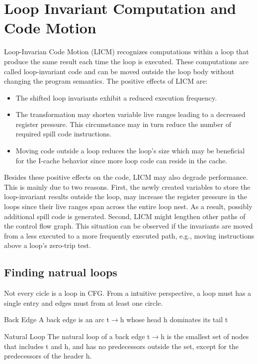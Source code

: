 \newpage

\section{Loop Invariant Computation and Code Motion}


Loop-Invarian Code Motion (LICM) recognizes computations within a loop that produce the same result each time the loop is executed. 
These computations are called loop-invariant code and can be moved outside the loop body without changing the program semantics. 
The positive effects of LICM are:
\begin{itemize}
\item The shifted loop invariants exhibit a reduced execution frequency.
\item The transformation may shorten variable live ranges leading to a decreased register pressure. This circumstance may in turn reduce the number of required spill code instructions.
\item Moving code outside a loop reduces the loop's size which may be beneficial for the I-cache behavior since more loop code can reside in the cache.
\end{itemize}

Besides these positive effects on the code, LICM may also degrade performance. This is mainly due to two reasons. First, the newly created variables to store the loop-invariant results outside the loop, may increase the register pressure in the loops since their live ranges span across the entire loop nest. As a result, possibly additional spill code is generated. 
Second, LICM might lengthen other paths of the control flow graph. This situation can be observed if the invariants are moved from a less executed to a more frequently executed path, e.g., moving instructions above a loop's zero-trip test.


\subsection{Finding natrual loops}

Not every cicle is a loop in CFG. From a intuitive perspective, a loop must has a single entry and edges must from at least one circle.   

\begin{definition}{Back Edge}
    A back edge is an arc t$\rightarrow$h whose
head h dominates its tail t
\end{definition}

\begin{definition}{Natural Loop}
    The natural loop of a back edge t$\rightarrow$h
    is the smallest set of nodes that
    includes t and h, and has
    no predecessors outside the set,
    except for the predecessors of the header h.
\end{definition}


